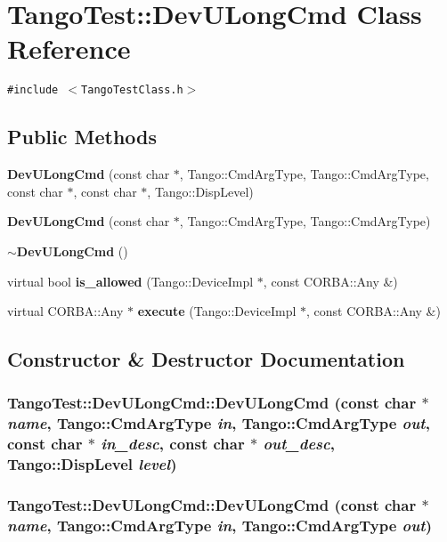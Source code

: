 \section{Tango\-Test::Dev\-ULong\-Cmd  Class Reference}
\label{classTangoTest_1_1DevULongCmd}
{\tt \#include $<$Tango\-Test\-Class.h$>$}

\subsection*{Public Methods}
\begin{CompactItemize}
\item 
{\bf Dev\-ULong\-Cmd} (const char $\ast$, Tango::Cmd\-Arg\-Type, Tango::Cmd\-Arg\-Type, const char $\ast$, const char $\ast$, Tango::Disp\-Level)
\item 
{\bf Dev\-ULong\-Cmd} (const char $\ast$, Tango::Cmd\-Arg\-Type, Tango::Cmd\-Arg\-Type)
\item 
{\bf $\sim$Dev\-ULong\-Cmd} ()
\item 
virtual bool {\bf is\_\-allowed} (Tango::Device\-Impl $\ast$, const CORBA::Any \&)
\item 
virtual CORBA::Any $\ast$ {\bf execute} (Tango::Device\-Impl $\ast$, const CORBA::Any \&)
\end{CompactItemize}


\subsection{Constructor \& Destructor Documentation}
\subsubsection{\setlength{\rightskip}{0pt plus 5cm}Tango\-Test::Dev\-ULong\-Cmd::Dev\-ULong\-Cmd (const char $\ast$ {\em name}, Tango::Cmd\-Arg\-Type {\em in}, Tango::Cmd\-Arg\-Type {\em out}, const char $\ast$ {\em in\_\-desc}, const char $\ast$ {\em out\_\-desc}, Tango::Disp\-Level {\em level})}\label{classTangoTest_1_1DevULongCmd_a0}


\subsubsection{\setlength{\rightskip}{0pt plus 5cm}Tango\-Test::Dev\-ULong\-Cmd::Dev\-ULong\-Cmd (const char $\ast$ {\em name}, Tango::Cmd\-Arg\-Type {\em in}, Tango::Cmd\-Arg\-Type {\em out})}\label{classTangoTest_1_1DevULongCmd_a1}


